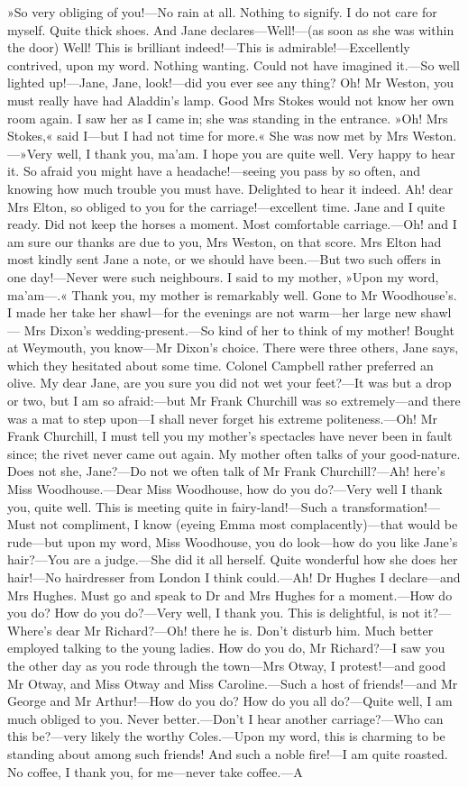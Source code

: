 »So very obliging of you!—No rain at all. Nothing to signify. I do not care for myself. Quite thick shoes. And Jane declares—Well!—(as soon as she was within the door) Well! This is brilliant indeed!—This is admirable!—Excellently contrived, upon my word. Nothing wanting. Could not have imagined it.—So well lighted up!—Jane, Jane, look!—did you ever see any thing? Oh! Mr Weston, you must really have had Aladdin's lamp. Good Mrs Stokes would not know her own room again. I saw her as I came in; she was standing in the entrance. »Oh! Mrs Stokes,« said I—but I had not time for more.« She was now met by Mrs Weston.—»Very well, I thank you, ma'am. I hope you are quite well. Very happy to hear it. So afraid you might have a headache!—seeing you pass by so often, and knowing how much trouble you must have. Delighted to hear it indeed. Ah! dear Mrs Elton, so obliged to you for the carriage!—excellent time. Jane and I quite ready. Did not keep the horses a moment. Most comfortable carriage.—Oh! and I am sure our thanks are due to you, Mrs Weston, on that score. Mrs Elton had most kindly sent Jane a note, or we should have been.—But two such offers in one day!—Never were such neighbours. I said to my mother, »Upon my word, ma'am—.« Thank you, my mother is remarkably well. Gone to Mr Woodhouse's. I made her take her shawl—for the evenings are not warm—her large new shawl— Mrs Dixon's wedding-present.—So kind of her to think of my mother! Bought at Weymouth, you know—Mr Dixon's choice. There were three others, Jane says, which they hesitated about some time. Colonel Campbell rather preferred an olive. My dear Jane, are you sure you did not wet your feet?—It was but a drop or two, but I am so afraid:—but Mr Frank Churchill was so extremely—and there was a mat to step upon—I shall never forget his extreme politeness.—Oh! Mr Frank Churchill, I must tell you my mother's spectacles have never been in fault since; the rivet never came out again. My mother often talks of your good-nature. Does not she, Jane?—Do not we often talk of Mr Frank Churchill?—Ah! here's Miss Woodhouse.—Dear Miss Woodhouse, how do you do?—Very well I thank you, quite well. This is meeting quite in fairy-land!—Such a transformation!—Must not compliment, I know (eyeing Emma most complacently)—that would be rude—but upon my word, Miss Woodhouse, you do look—how do you like Jane's hair?—You are a judge.—She did it all herself. Quite wonderful how she does her hair!—No hairdresser from London I think could.—Ah! Dr Hughes I declare—and Mrs Hughes. Must go and speak to Dr and Mrs Hughes for a moment.—How do you do? How do you do?—Very well, I thank you. This is delightful, is not it?—Where's dear Mr Richard?—Oh! there he is. Don't disturb him. Much better employed talking to the young ladies. How do you do, Mr Richard?—I saw you the other day as you rode through the town—Mrs Otway, I protest!—and good Mr Otway, and Miss Otway and Miss Caroline.—Such a host of friends!—and Mr George and Mr Arthur!—How do you do? How do you all do?—Quite well, I am much obliged to you. Never better.—Don't I hear another carriage?—Who can this be?—very likely the worthy Coles.—Upon my word, this is charming to be standing about among such friends! And such a noble fire!—I am quite roasted. No coffee, I thank you, for me—never take coffee.—A 